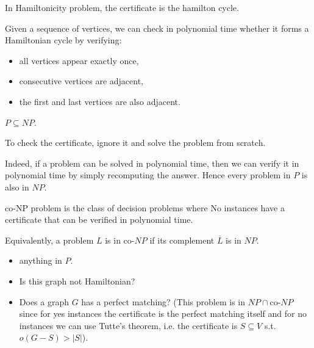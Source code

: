 \begin{eg}
    In Hamiltonicity problem, the certificate is the hamilton cycle. 
\end{eg}

\begin{remark}
Given a sequence of vertices, we can check in polynomial time whether it forms a Hamiltonian cycle by verifying:
\begin{itemize}
    \item all vertices appear exactly once,
    \item consecutive vertices are adjacent,
    \item the first and last vertices are also adjacent.
\end{itemize}
\end{remark}

\begin{claim}
    $P \subseteq NP$. 
\end{claim}
\begin{explanation}
    To check the certificate, ignore it and solve the problem from scratch.
\end{explanation}

\begin{remark}
Indeed, if a problem can be solved in polynomial time, then we can verify it in polynomial time by simply recomputing the answer. Hence every problem in $P$ is also in $NP$.
\end{remark}

\begin{definition}[co-NP]
    co-NP problem is the class of decision problems where No instances have a certificate that can be verified in polynomial time.
\end{definition}

\begin{remark}
Equivalently, a problem $L$ is in co-$NP$ if its complement $\overline{L}$ is in $NP$.
\end{remark}

\begin{eg}[co-NP]
\hfill
    \begin{itemize}
        \item anything in $P$. 
        \item Is this graph not Hamiltonian?
        \item Does a graph $G$ has a perfect matching? (This problem is in $NP \cap \text{co-}NP$ since for yes instances the certificate is the perfect matching itself and for no instances we can use Tutte's theorem, i.e. the certificate is $S \subseteq V$ s.t. $o(G - S) > |S|$).  
    \end{itemize}
\end{eg}

